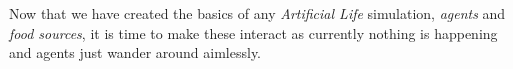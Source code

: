 Now that we have created the basics of any \textit{Artificial Life} simulation, \textit{agents} and \textit{food sources}, it is time to make these interact as currently nothing is happening and agents just wander around aimlessly.